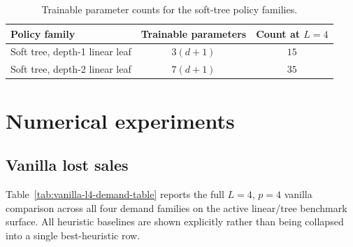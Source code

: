 \documentclass[11pt]{article}
\begin{document}
\begin{table}[t]
\centering
\small
\caption{Trainable parameter counts for the soft-tree policy families.}
\label{tab:tree-parameter-counts}
\begin{tabular}{|l|c|c|}
\hline
Policy family & Trainable parameters & Count at $L=4$ \\
\hline
Soft tree, depth-1 linear leaf & $3(d+1)$ & $15$ \\
Soft tree, depth-2 linear leaf & $7(d+1)$ & $35$ \\
\hline
\end{tabular}
\end{table}

\section{Numerical experiments}

\subsection{Vanilla lost sales}

Table~\ref{tab:vanilla-l4-demand-table} reports the full $L=4$, $p=4$ vanilla comparison across
all four demand families on the active linear/tree benchmark surface. All heuristic baselines are
shown explicitly rather than being collapsed into a single best-heuristic row.
\end{document}
